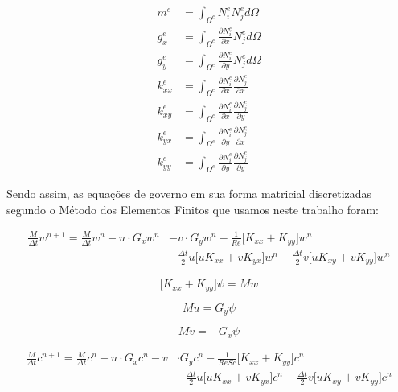 \begin{equation}
 \begin{aligned}
  m^{e} & = \int_{\Omega^{e}} N_{i}^{e} N_{j}^{e} d\Omega \\
  g_{x}^{e} & = \int_{\Omega^{e}} \frac{\partial N_{i}^{e}}{\partial x} N_{j}^{e} d\Omega \\
  g_{y}^{e} & = \int_{\Omega^{e}} \frac{\partial N_{i}^{e}}{\partial y} N_{j}^{e} d\Omega \\
  k_{xx}^{e} & = \int_{\Omega^{e}} \frac{\partial N_{i}^{e}}{\partial x} \frac{\partial N_{j}^{e}}{\partial x} \\
  k_{xy}^{e} & = \int_{\Omega^{e}} \frac{\partial N_{i}^{e}}{\partial x} \frac{\partial N_{j}^{e}}{\partial y} \\
  k_{yx}^{e} & = \int_{\Omega^{e}} \frac{\partial N_{i}^{e}}{\partial y} \frac{\partial N_{j}^{e}}{\partial x} \\
  k_{yy}^{e} & = \int_{\Omega^{e}} \frac{\partial N_{i}^{e}}{\partial y} \frac{\partial N_{j}^{e}}{\partial y}
 \end{aligned}
\end{equation}

\medskip
Sendo assim, as equações de governo em sua forma matricial discretizadas
segundo o Método dos Elementos Finitos que usamos neste trabalho foram:

\begin{equation} \label{final equation}
\begin{aligned}
 \frac{M}{\Delta t} w^{n+1} = \frac{M}{\Delta t} w^{n} - u \cdot G_x w^{n} & - v \cdot G_y w^{n} 
 - \frac{1}{\textit{Re}} \Big[ K_{xx} + K_{yy} \Big] w^{n}  
 \\[5pt]
 & - \frac{\Delta t}{2} u \Big[ u K_{xx} + v K_{yx} \Big] w^{n} 
 - \frac{\Delta t}{2} v \Big[ u K_{xy} + v K_{yy} \Big] w^{n} 
\end{aligned}
\end{equation}


\begin{equation}
 \Big[ K_{xx} + K_{yy} \Big] \psi = Mw
\end{equation}

\begin{equation}
 Mu = G_y \psi
\end{equation}

\begin{equation}
 Mv = - G_x \psi
\end{equation}

\begin{equation}
\begin{aligned}
 \frac{M}{\Delta t} c^{n+1} = \frac{M}{\Delta t} c^{n}  - u \cdot G_x c^{n} - v & \cdot G_y c^{n} 
 - \frac{1}{\textit{ReSc}} \Big[ K_{xx} + K_{yy} \Big] c^{n}  
 \\[5pt]
 & - \frac{\Delta t}{2} u \Big[ u K_{xx} + v K_{yx} \Big] c^{n} 
 - \frac{\Delta t}{2} v \Big[ u K_{xy} + v K_{yy} \Big] c^{n} 
\end{aligned}
\end{equation}
